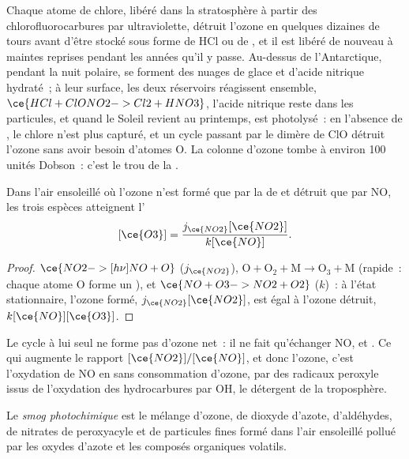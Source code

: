 Chaque atome de chlore, libéré dans la stratosphère à partir des
chlorofluorocarbures par  ultraviolette, détruit l'ozone en
quelques dizaines de tours avant d'être stocké sous forme de
HCl ou de , et il est libéré de nouveau à maintes reprises
pendant les années qu'il y passe. Au-dessus de l'Antarctique, pendant la
nuit polaire, se forment des nuages de glace et d'acide nitrique
hydraté~; à leur surface, les deux réservoirs réagissent ensemble,
$\ce{HCl + ClONO2 -> Cl2 + HNO3}$, l'acide nitrique reste dans les
particules, et quand le Soleil revient au printemps,  est
photolysé~: en l'absence de , le chlore n'est plus capturé, et un
cycle passant par le dimère de ClO détruit l'ozone sans avoir besoin
d'atomes O. La colonne d'ozone tombe à environ 100 unités Dobson~: c'est
le trou de la .

\begin{proposition}\label{prop:b3:photochemistry:leighton}
Dans l'air ensoleillé où l'ozone n'est formé que par la  de
 et détruit que par NO, les trois espèces atteignent l'
\[
  [\ce{O3}] = \frac{j_{\ce{NO2}}[\ce{NO2}]}{k[\ce{NO}]} .
\]
\end{proposition}

\begin{proof}
$\ce{NO2 ->[h\nu] NO + O}$ ($j_{\ce{NO2}}$), $\mathrm{O + O_2 + M \to O_3 + M}$
(rapide~: chaque atome O forme un ), et
$\ce{NO + O3 -> NO2 + O2}$ ($k$)~: à l'état stationnaire, l'ozone formé,
$j_{\ce{NO2}}[\ce{NO2}]$, est égal à
l'ozone détruit, $k[\ce{NO}][\ce{O3}]$.
\end{proof}

Le cycle à lui seul ne forme pas d'ozone net~: il ne fait qu'échanger
NO,  et . Ce qui augmente le rapport
$[\ce{NO2}]/[\ce{NO}]$, et donc l'ozone, c'est l'oxydation de NO en
 sans consommation d'ozone, par des radicaux peroxyle issus de
l'oxydation des hydrocarbures par OH, le détergent de la troposphère.

\begin{definition}\label{def:b3:photochemistry:smog}
Le \emph{smog photochimique} est le mélange
d'ozone, de dioxyde d'azote, d'aldéhydes, de nitrates de peroxyacyle et
de particules fines formé dans l'air ensoleillé pollué par les oxydes
d'azote et les composés organiques volatils.
\end{definition}

